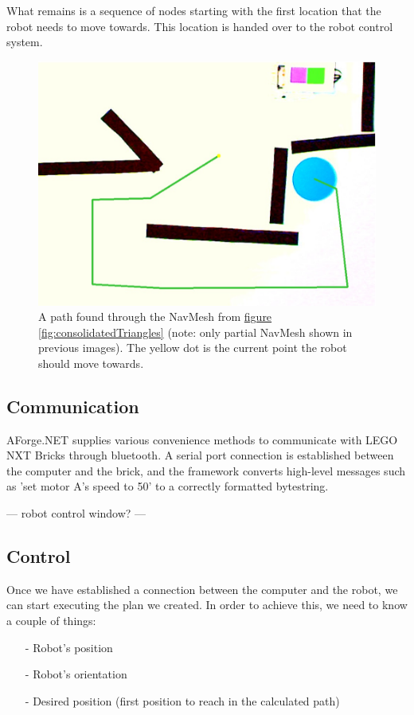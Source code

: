\documentclass[10pt, abstracton]{scrartcl}
\newcommand{\fref}[1]{\hyperref[#1]{figure \vref{#1}}}
\begin{document}
What remains is a sequence of nodes starting with the first location that the robot needs to move towards. This location is handed over to the robot control system.

\begin{figure}
	\centering
	\includegraphics[width=\columnwidth]{pictures/computedPath.png}
	\caption{\small A path found through the NavMesh from \fref{fig:consolidatedTriangles} (note: only partial NavMesh shown in previous images). The yellow dot is the current point the robot should move towards.}
	\label{fig:computedPath}
\end{figure}

\subsection{Communication}
AForge.NET supplies various convenience methods to communicate with LEGO NXT Bricks through bluetooth. A serial port connection is established between the computer and the brick, and the framework converts high-level messages such as 'set motor A's speed to 50' to a correctly formatted bytestring.

--- robot control window? ---

\subsection{Control}
Once we have established a connection between the computer and the robot, we can start executing the plan we created. In order to achieve this, we need to know a couple of things:

\begin{itemize}
	\item[-] Robot's position
	\item[-] Robot's orientation
	\item[-] Desired position (first position to reach in the calculated path)
\end{itemize}
\end{document}
